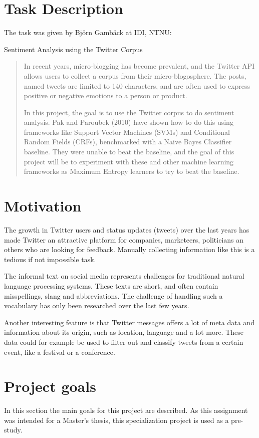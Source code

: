 \section{Task Description}
The task was given by Björn Gambäck at IDI, NTNU:
\begin{center} \Large Sentiment Analysis using the Twitter Corpus \end{center}
\begin{quotation}
In recent years, micro-blogging has become prevalent, and the Twitter API allows users to collect a corpus from their micro-blogosphere. The posts, named tweets are limited to 140 characters, and are often used to express positive or negative emotions to a person or product.

In this project, the goal is to use the Twitter corpus to do sentiment analysis. Pak and Paroubek (2010) have shown how to do this using frameworks like Support Vector Machines (SVMs) and Conditional Random Fields (CRFs), benchmarked with a Naive Bayes Classifier baseline. They were unable to beat the baseline, and the goal of this project will be to experiment with these and other machine learning frameworks as Maximum Entropy learners to try to beat the baseline.
\end{quotation}

\section{Motivation}
The growth in Twitter users and status updates (tweets) over the last years has made Twitter an attractive platform for companies, marketeers, politicians an others who are looking for feedback. Manually collecting information like this is a tedious if not impossible task.

The informal text on social media represents challenges for traditional natural language processing systems. These texts are short, and  often contain misspellings, slang and abbreviations. The challenge of handling such a vocabulary has only been researched over the last few years.

Another interesting feature is that Twitter messages offers a lot of meta data and information about its origin, such as location, language and a lot more. These data could for example be used to filter out and classify tweets from a certain event, like a festival or a conference.

\section{Project goals}
In this section the main goals for this project are described. As this assignment was intended for a Master's thesis, this specialization project is used as a pre-study.

